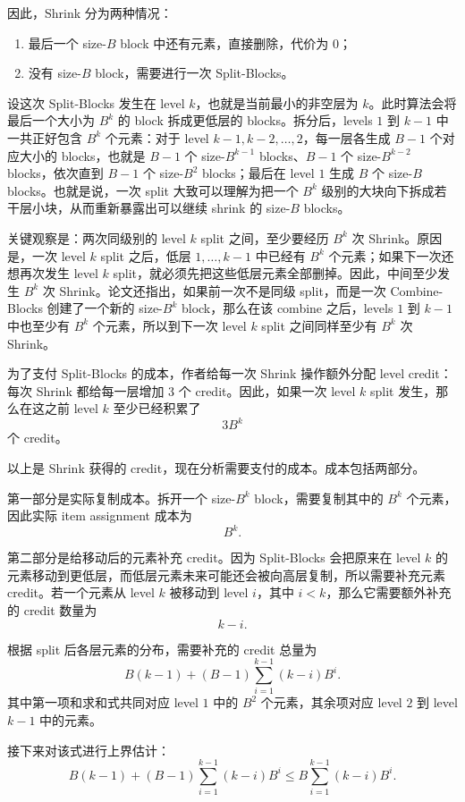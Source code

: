 \documentclass[12pt,a4paper]{article}
\begin{document}
因此，Shrink 分为两种情况：
\begin{enumerate}
    \item 最后一个 size-$B$ block 中还有元素，直接删除，代价为 $0$；
    \item 没有 size-$B$ block，需要进行一次 Split-Blocks。
\end{enumerate}

设这次 Split-Blocks 发生在 level $k$，也就是当前最小的非空层为 $k$。此时算法会将最后一个大小为 $B^k$ 的 block 拆成更低层的 blocks。拆分后，levels $1$ 到 $k-1$ 中一共正好包含 $B^k$ 个元素：对于 level $k-1,k-2,\ldots,2$，每一层各生成 $B-1$ 个对应大小的 blocks，也就是 $B-1$ 个 size-$B^{k-1}$ blocks、$B-1$ 个 size-$B^{k-2}$ blocks，依次直到 $B-1$ 个 size-$B^2$ blocks；最后在 level $1$ 生成 $B$ 个 size-$B$ blocks。也就是说，一次 split 大致可以理解为把一个 $B^k$ 级别的大块向下拆成若干层小块，从而重新暴露出可以继续 shrink 的 size-$B$ blocks。

关键观察是：两次同级别的 level $k$ split 之间，至少要经历 $B^k$ 次 Shrink。原因是，一次 level $k$ split 之后，低层 $1,\ldots,k-1$ 中已经有 $B^k$ 个元素；如果下一次还想再次发生 level $k$ split，就必须先把这些低层元素全部删掉。因此，中间至少发生 $B^k$ 次 Shrink。论文还指出，如果前一次不是同级 split，而是一次 Combine-Blocks 创建了一个新的 size-$B^k$ block，那么在该 combine 之后，levels $1$ 到 $k-1$ 中也至少有 $B^k$ 个元素，所以到下一次 level $k$ split 之间同样至少有 $B^k$ 次 Shrink。

为了支付 Split-Blocks 的成本，作者给每一次 Shrink 操作额外分配 level credit：每次 Shrink 都给每一层增加 $3$ 个 credit。因此，如果一次 level $k$ split 发生，那么在这之前 level $k$ 至少已经积累了
\[
3B^k
\]
个 credit。

以上是 Shrink 获得的 credit，现在分析需要支付的成本。成本包括两部分。

第一部分是实际复制成本。拆开一个 size-$B^k$ block，需要复制其中的 $B^k$ 个元素，因此实际 item assignment 成本为
\[
B^k.
\]

第二部分是给移动后的元素补充 credit。因为 Split-Blocks 会把原来在 level $k$ 的元素移动到更低层，而低层元素未来可能还会被向高层复制，所以需要补充元素 credit。若一个元素从 level $k$ 被移动到 level $i$，其中 $i<k$，那么它需要额外补充的 credit 数量为
\[
k-i.
\]

根据 split 后各层元素的分布，需要补充的 credit 总量为
\[
B(k-1)+(B-1)\sum_{i=1}^{k-1}(k-i)B^i.
\]
其中第一项和求和式共同对应 level $1$ 中的 $B^2$ 个元素，其余项对应 level $2$ 到 level $k-1$ 中的元素。

接下来对该式进行上界估计：
\[
B(k-1)+(B-1)\sum_{i=1}^{k-1}(k-i)B^i
\le
B\sum_{i=1}^{k-1}(k-i)B^i.
\]
\end{document}
